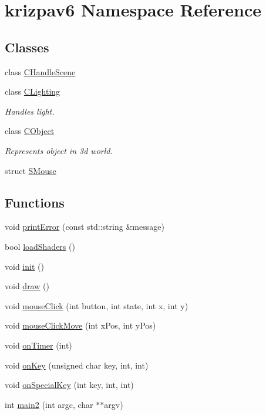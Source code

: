\hypertarget{namespacekrizpav6}{}\section{krizpav6 Namespace Reference}
\label{namespacekrizpav6}
\subsection*{Classes}
\begin{DoxyCompactItemize}
\item 
class \mbox{\hyperlink{classkrizpav6_1_1_c_handle_scene}{C\+Handle\+Scene}}
\item 
class \mbox{\hyperlink{classkrizpav6_1_1_c_lighting}{C\+Lighting}}
\begin{DoxyCompactList}\small\item\em Handles light. \end{DoxyCompactList}\item 
class \mbox{\hyperlink{classkrizpav6_1_1_c_object}{C\+Object}}
\begin{DoxyCompactList}\small\item\em Represents object in 3d world. \end{DoxyCompactList}\item 
struct \mbox{\hyperlink{structkrizpav6_1_1_s_mouse}{S\+Mouse}}
\end{DoxyCompactItemize}
\subsection*{Functions}
\begin{DoxyCompactItemize}
\item 
void \mbox{\hyperlink{namespacekrizpav6_a90d5cfc723ed2f9805870e7a0b6587cf}{print\+Error}} (const std\+::string \&message)
\item 
bool \mbox{\hyperlink{namespacekrizpav6_a83413961818b7cfa0c3ecf96ac0f3361}{load\+Shaders}} ()
\item 
void \mbox{\hyperlink{namespacekrizpav6_accd659c04e11a41feef1fbbcc3389608}{init}} ()
\item 
void \mbox{\hyperlink{namespacekrizpav6_a652b6bbf940fd2a51e800a1dfd21c951}{draw}} ()
\item 
void \mbox{\hyperlink{namespacekrizpav6_a7e8813c4296f5da203be62fa2c5fc5e9}{mouse\+Click}} (int button, int state, int x, int y)
\item 
void \mbox{\hyperlink{namespacekrizpav6_a3cefc706eb697de70b0db0598217f24c}{mouse\+Click\+Move}} (int x\+Pos, int y\+Pos)
\item 
void \mbox{\hyperlink{namespacekrizpav6_a23bdf5027af84f3f40742a64f74744bb}{on\+Timer}} (int)
\item 
void \mbox{\hyperlink{namespacekrizpav6_accdafee6bcc481246d110e7a2023cad6}{on\+Key}} (unsigned char key, int, int)
\item 
void \mbox{\hyperlink{namespacekrizpav6_af94b0984a9318836f32a2438a711e8af}{on\+Special\+Key}} (int key, int, int)
\item 
int \mbox{\hyperlink{namespacekrizpav6_af875a38a617fab4f65c59bb5521112bc}{main2}} (int argc, char $\ast$$\ast$argv)
\end{DoxyCompactItemize}
